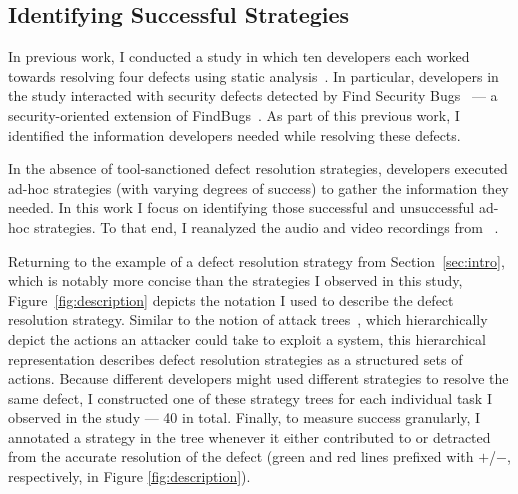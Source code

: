 \documentclass{sig-alternate}
\begin{document}

%

\subsection{Identifying Successful Strategies}
In previous work, I conducted a study in which ten developers each worked towards resolving four defects using static analysis~\cite{Smith2015}.
In particular, developers in the study interacted with security defects detected by Find Security Bugs~\cite{FindSecurityBugs} --- a security-oriented extension of FindBugs~\cite{FindBugs}.
As part of this previous work, I identified the information developers needed while resolving these defects.

In the absence of tool-sanctioned defect resolution strategies, developers executed ad-hoc strategies (with varying degrees of success) to gather the information they needed.
In this work I focus on identifying those successful and unsuccessful ad-hoc strategies.
To that end, I reanalyzed the audio and video recordings from ~\cite{Smith2015}. 

Returning to the example of a defect resolution strategy from Section~\ref{sec:intro}, which is notably more concise than the strategies I observed in this study, Figure~\ref{fig:description} depicts the notation I used to describe the defect resolution strategy. 
Similar to the notion of attack trees~\cite{attackTrees}, which hierarchically depict the actions an attacker could take to exploit a system, this hierarchical representation describes defect resolution strategies as a structured sets of actions.
Because different developers might used different strategies to resolve the same defect, I constructed one of these strategy trees for each individual task I observed in the study --- 40 in total.
Finally, to measure success granularly, I annotated a strategy in the tree whenever it either contributed to or detracted from the accurate resolution of the defect (green and red lines prefixed with $+$/$-$, respectively, in Figure \ref{fig:description}).
\end{document}
